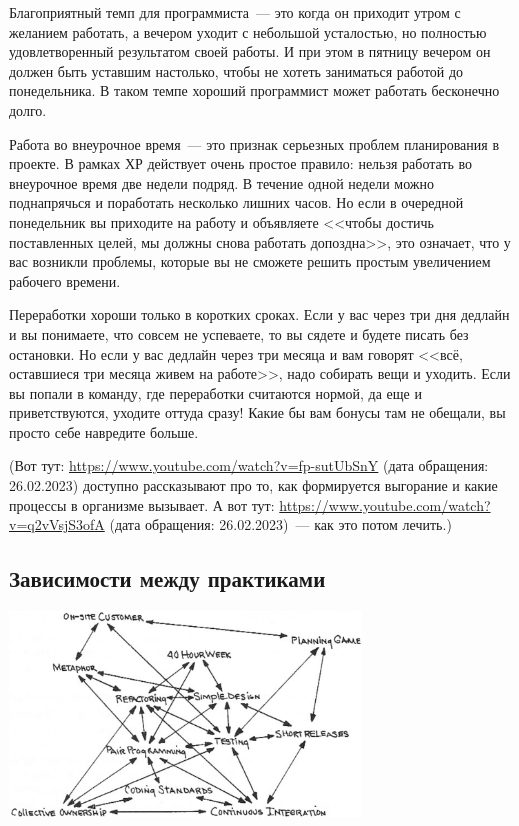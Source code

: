 \documentclass{../../text-style}
\begin{document}
Благоприятный темп для программиста~--- это когда он приходит утром с желанием работать, а вечером уходит с небольшой усталостью, но полностью удовлетворенный результатом своей работы. И при этом в пятницу вечером он должен быть уставшим настолько, чтобы не хотеть заниматься работой до понедельника. В таком темпе хороший программист может работать бесконечно долго.

Работа во внеурочное время~--- это признак серьезных проблем планирования в проекте. В рамках ХР действует очень простое правило: нельзя работать во внеурочное время две недели подряд. В течение одной недели можно поднапрячься и поработать несколько лишних часов. Но если в очередной понедельник вы приходите на работу и объявляете <<чтобы достичь поставленных целей, мы должны снова работать допоздна>>, это означает, что у вас возникли проблемы, которые вы не сможете решить простым увеличением рабочего времени.

Переработки хороши только в коротких сроках. Если у вас через три дня дедлайн и вы понимаете, что совсем не успеваете, то вы сядете и будете писать без остановки. Но если у вас дедлайн через три месяца и вам говорят <<всё, оставшиеся три месяца живем на работе>>, надо собирать вещи и уходить. Если вы попали в команду, где переработки считаются нормой, да еще и приветствуются, уходите оттуда сразу! Какие бы вам бонусы там не обещали, вы просто себе навредите больше.

(Вот тут: \url{https://www.youtube.com/watch?v=fp-sutUbSnY} (дата обращения: 26.02.2023) доступно рассказывают про то, как формируется выгорание и какие процессы в организме вызывает. А вот тут: \url{https://www.youtube.com/watch?v=q2vVsjS3ofA} (дата обращения: 26.02.2023)~--- как это потом лечить.)

\subsection{Зависимости между практиками}

\begin{center}
    \includegraphics[width=0.7\textwidth]{xpPracticesRelationship.png}
\end{center}
\end{document}
